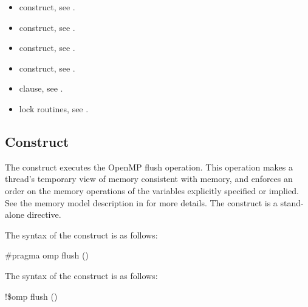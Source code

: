 \crossreferences
\begin{itemize}
\item {} construct, see 
. 

\item {} construct, see 
.

\item {} construct, see 
.

\item {} construct, see 
.

\item {} clause, see 
.

\item lock routines, see 
.
\end{itemize}









\subsection{ Construct}
\label{subsec:flush Construct}
\summary
The  construct executes the OpenMP flush operation. This operation makes a 
thread’s temporary view of memory consistent with memory, and enforces an order on 
the memory operations of the variables explicitly specified or implied. See the memory 
model description in  for more details. The  construct is a 
stand-alone directive.

\syntax
\ccppspecificstart
The syntax of the  construct is as follows:

\begin{boxedcode}
\#pragma omp flush \plc{[}()\plc{] new-line}
\end{boxedcode}
\ccppspecificend

\fortranspecificstart
The syntax of the  construct is as follows:

\begin{boxedcode}
!\$omp flush \plc{[}()\plc{]}
\end{boxedcode}
\fortranspecificend

